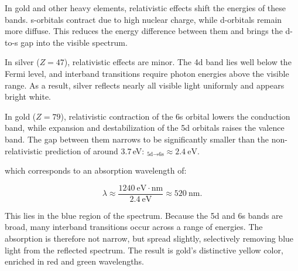 In gold and other heavy elements, relativistic effects shift the energies of these bands. s-orbitals contract due to high nuclear charge, while d-orbitals remain more diffuse. This reduces the energy difference between them and brings the d-to-s gap into the visible spectrum.

In silver ($Z = 47$), relativistic effects are minor. The 4d band lies well below the Fermi level, and interband transitions require photon energies above the visible range. As a result, silver reflects nearly all visible light uniformly and appears bright white.

In gold ($Z = 79$), relativistic contraction of the 6s orbital lowers the conduction band, while expansion and destabilization of the 5d orbitals raises the valence band. The gap between them narrows to be significantly smaller than the non-relativistic prediction of around 3.7 eV: $_{\text{5d} \to \text{6s}} \approx 2.4\ \text{eV}.$

which corresponds to an absorption wavelength of:

$$
\lambda \approx \frac{1240\ \text{eV}\cdot\text{nm}}{2.4\ \text{eV}} \approx 520\ \text{nm}.
$$

This lies in the blue region of the spectrum. Because the 5d and 6s bands are broad, many interband transitions occur across a range of energies. The absorption is therefore not narrow, but spread slightly, selectively removing blue light from the reflected spectrum. The result is gold’s distinctive yellow color, enriched in red and green wavelengths.




